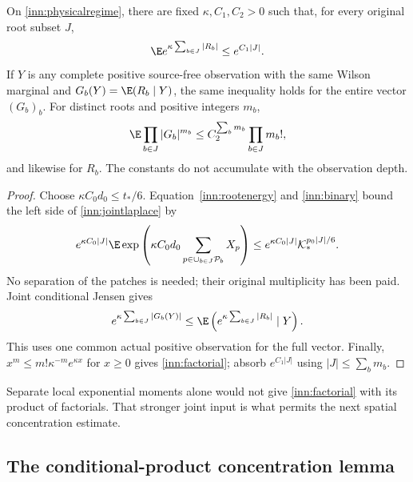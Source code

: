\begin{lemma}
\label{inn:jointmoments}
On \eqref{inn:physicalregime}, there are fixed $\kappa,C_1,C_2>0$ such that, for every original root subset $J$,
\begin{equation}
 \E e^{\kappa\sum_{b\in J}|R_b|}\le e^{C_1|J|}.
 \label{inn:jointlaplace}
\end{equation}
If $Y$ is any complete positive source-free observation with the same Wilson marginal and $G_b(Y)=\E(R_b\mid Y)$, the same inequality holds for the entire vector $(G_b)_b$. For distinct roots and positive integers $m_b$,
\begin{equation}
 \E\prod_{b\in J}|G_b|^{m_b}
 \le C_2^{\sum_bm_b}\prod_{b\in J}m_b!,
 \label{inn:factorial}
\end{equation}
and likewise for $R_b$. The constants do not accumulate with the observation depth.
\end{lemma}
\begin{proof}
Choose $\kappa C_0d_0\le t_*/6$. Equation~\eqref{inn:rootenergy} and \eqref{inn:binary} bound the left side of \eqref{inn:jointlaplace} by
\[
 e^{\kappa C_0|J|}
 \E\exp\left(\kappa C_0d_0
                \sum_{p\in\cup_{b\in J}{\cal P}_b}X_p\right)
 \le e^{\kappa C_0|J|}{\cal K}_*^{p_0|J|/6}.
\]
No separation of the patches is needed; their original multiplicity has been paid. Joint conditional Jensen gives
\[
 e^{\kappa\sum_{b\in J}|G_b(Y)|}
 \le \E\left(e^{\kappa\sum_{b\in J}|R_b|}\mid Y\right).
\]
This uses one common actual positive observation for the full vector. Finally,
$x^m\le m!\kappa^{-m}e^{\kappa x}$ for $x\ge0$ gives \eqref{inn:factorial}; absorb $e^{C_1|J|}$ using $|J|\le\sum_bm_b$.
\end{proof}

Separate local exponential moments alone would not give \eqref{inn:factorial} with its product of factorials. That stronger joint input is what permits the next spatial concentration estimate.

\subsection{The conditional-product concentration lemma}

